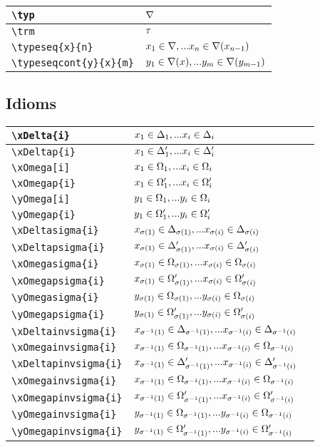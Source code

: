 \documentclass[10pt,a4paper]{article}
\begin{document}
\begin{tabular}{| l | l |}
 \hline
 \verb!\typ!         &   $\typ$    \\
 \hline
 \verb!\trm!         &   $\trm$     \\
 \hline
 \verb!\typeseq{x}{n}!  & $\typeseq{x}{n}$ \\
 \hline
 \verb!\typeseqcont{y}{x}{m}! & $\typeseqcont{y}{x}{m}$ \\
 \hline
\end{tabular}

\subsection{Idioms}
\begin{tabular}{| l | l |p{3cm}|}
\hline
\verb!\xDelta{i}! & $\xDelta{i}$&\\
 \hline
\verb!\xDeltap{i}! & $\xDeltap{i}$&\\
 \hline
\verb!\xOmega[i]! & $\xOmega{i}$&\\
 \hline
\verb!\xOmegap{i}! & $\xOmegap{i}$&\\
 \hline
\verb!\yOmega[i]! & $\yOmega{i}$&\\
 \hline
\verb!\yOmegap{i}! & $\yOmegap{i}$&\\
 \hline
\hline
\verb!\xDeltasigma{i}! & $\xDeltasigma{i}$&\\
\hline
\verb!\xDeltapsigma{i}! & $\xDeltapsigma{i}$&\\
 \hline
\verb!\xOmegasigma{i}! & $\xOmegasigma{i}$&\\
 \hline
\verb!\xOmegapsigma{i}! & $\xOmegapsigma{i}$&\\
 \hline
\verb!\yOmegasigma{i}! & $\yOmegasigma{i}$&\\
 \hline
\verb!\yOmegapsigma{i}! & $\yOmegapsigma{i}$&\\
 \hline
\hline
\verb!\xDeltainvsigma{i}! & $\xDeltainvsigma{i}$&\\
 \hline
\verb!\xOmegainvsigma{i}! & $\xOmegainvsigma{i}$&\\
\hline
\verb!\xDeltapinvsigma{i}! & $\xDeltapinvsigma{i}$&\\
 \hline
\verb!\xOmegainvsigma{i}! & $\xOmegainvsigma{i}$&\\
 \hline
\verb!\xOmegapinvsigma{i}! & $\xOmegapinvsigma{i}$&\\
 \hline
\verb!\yOmegainvsigma{i}! & $\yOmegainvsigma{i}$&\\
 \hline
\verb!\yOmegapinvsigma{i}! & $\yOmegapinvsigma{i}$&\\
 \hline
\end{tabular} \\
\end{document}
